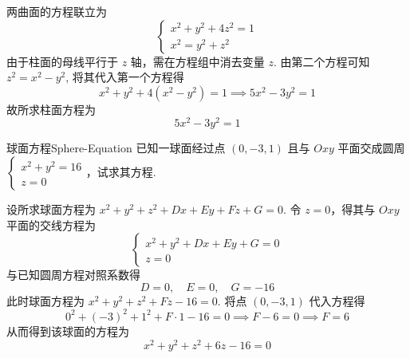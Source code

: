 \begin{solution}
    两曲面的方程联立为
    \begin{equation*}
        \begin{cases}
            x^2 + y^2 + 4z^2 = 1 \\
            x^2 = y^2 + z^2
        \end{cases}
    \end{equation*}
    由于柱面的母线平行于 $z$ 轴，需在方程组中消去变量 $z$. 由第二个方程可知 $z^2 = x^2 - y^2$, 将其代入第一个方程得
    \begin{equation*}
        x^2 + y^2 + 4(x^2 - y^2) = 1 \implies 5x^2 - 3y^2 = 1
    \end{equation*}
    故所求柱面方程为
    \begin{equation*}
        \boxed{5x^2 - 3y^2 = 1}
    \end{equation*}
\end{solution}


\begin{problem}{球面方程}{Sphere-Equation}
    已知一球面经过点 $(0, -3, 1)$ 且与 $Oxy$ 平面交成圆周 $\begin{cases} x^2 + y^2 = 16 \\ z = 0 \end{cases}$，试求其方程.
\end{problem}

\begin{solution}
    设所求球面方程为 $x^2 + y^2 + z^2 + Dx + Ey + Fz + G = 0$. 令 $z = 0$，得其与 $Oxy$ 平面的交线方程为
    \begin{equation*}
        \begin{cases}
            x^2 + y^2 + Dx + Ey + G = 0 \\
            z = 0
        \end{cases}
    \end{equation*}
    与已知圆周方程对照系数得
    \begin{equation*}
        D = 0, \quad E = 0, \quad G = -16
    \end{equation*}
    此时球面方程为 $x^2 + y^2 + z^2 + Fz - 16 = 0$. 将点 $(0, -3, 1)$ 代入方程得
    \begin{equation*}
        0^2 + (-3)^2 + 1^2 + F \cdot 1 - 16 = 0 \implies F - 6 = 0 \implies F = 6
    \end{equation*}
    从而得到该球面的方程为
    \begin{equation*}
        \boxed{x^2 + y^2 + z^2 + 6z - 16 = 0}
    \end{equation*}
\end{solution}


